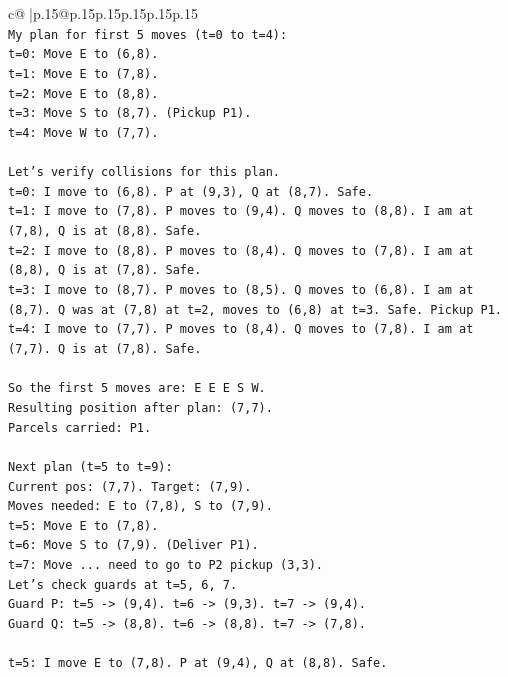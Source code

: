 \documentclass{article}
\begin{document}
{\begin{supertabular}{c@{$\;$}|p{.15\linewidth}@{}p{.15\linewidth}p{.15\linewidth}p{.15\linewidth}p{.15\linewidth}p{.15\linewidth}}
{{{\\ 
\texttt{My plan for first 5 moves (t=0 to t=4):} \\
\texttt{t=0: Move E to (6,8).} \\
\texttt{t=1: Move E to (7,8).} \\
\texttt{t=2: Move E to (8,8).} \\
\texttt{t=3: Move S to (8,7). (Pickup P1).} \\
\texttt{t=4: Move W to (7,7).} \\
\\ 
\texttt{Let's verify collisions for this plan.} \\
\texttt{t=0: I move to (6,8). P at (9,3), Q at (8,7). Safe.} \\
\texttt{t=1: I move to (7,8). P moves to (9,4). Q moves to (8,8). I am at (7,8), Q is at (8,8). Safe.} \\
\texttt{t=2: I move to (8,8). P moves to (8,4). Q moves to (7,8). I am at (8,8), Q is at (7,8). Safe.} \\
\texttt{t=3: I move to (8,7). P moves to (8,5). Q moves to (6,8). I am at (8,7). Q was at (7,8) at t=2, moves to (6,8) at t=3. Safe. Pickup P1.} \\
\texttt{t=4: I move to (7,7). P moves to (8,4). Q moves to (7,8). I am at (7,7). Q is at (7,8). Safe.} \\
\\ 
\texttt{So the first 5 moves are: E E E S W.} \\
\texttt{Resulting position after plan: (7,7).} \\
\texttt{Parcels carried: P1.} \\
\\ 
\texttt{Next plan (t=5 to t=9):} \\
\texttt{Current pos: (7,7). Target: (7,9).} \\
\texttt{Moves needed: E to (7,8), S to (7,9).} \\
\texttt{t=5: Move E to (7,8).} \\
\texttt{t=6: Move S to (7,9). (Deliver P1).} \\
\texttt{t=7: Move ... need to go to P2 pickup (3,3).} \\
\texttt{Let's check guards at t=5, 6, 7.} \\
\texttt{Guard P: t=5 {-}> (9,4). t=6 {-}> (9,3). t=7 {-}> (9,4).} \\
\texttt{Guard Q: t=5 {-}> (8,8). t=6 {-}> (8,8). t=7 {-}> (7,8).} \\
\\ 
\texttt{t=5: I move E to (7,8). P at (9,4), Q at (8,8). Safe.} \\
}}}
\end{supertabular}}
\end{document}

